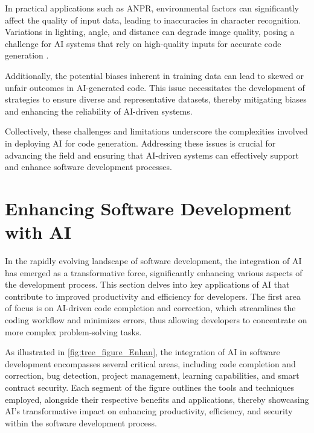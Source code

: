 In practical applications such as ANPR, environmental factors can significantly affect the quality of input data, leading to inaccuracies in character recognition. Variations in lighting, angle, and distance can degrade image quality, posing a challenge for AI systems that rely on high-quality inputs for accurate code generation \cite{adak2022automaticnumberplaterecognition}.



Additionally, the potential biases inherent in training data can lead to skewed or unfair outcomes in AI-generated code. This issue necessitates the development of strategies to ensure diverse and representative datasets, thereby mitigating biases and enhancing the reliability of AI-driven systems.



Collectively, these challenges and limitations underscore the complexities involved in deploying AI for code generation. Addressing these issues is crucial for advancing the field and ensuring that AI-driven systems can effectively support and enhance software development processes.













\section{Enhancing Software Development with AI} \label{sec:Enhancing Software Development with AI}


In the rapidly evolving landscape of software development, the integration of AI has emerged as a transformative force, significantly enhancing various aspects of the development process. This section delves into key applications of AI that contribute to improved productivity and efficiency for developers. The first area of focus is on AI-driven code completion and correction, which streamlines the coding workflow and minimizes errors, thus allowing developers to concentrate on more complex problem-solving tasks. 

As illustrated in \autoref{fig:tree_figure_Enhan}, the integration of AI in software development encompasses several critical areas, including code completion and correction, bug detection, project management, learning capabilities, and smart contract security. Each segment of the figure outlines the tools and techniques employed, alongside their respective benefits and applications, thereby showcasing AI's transformative impact on enhancing productivity, efficiency, and security within the software development process.

